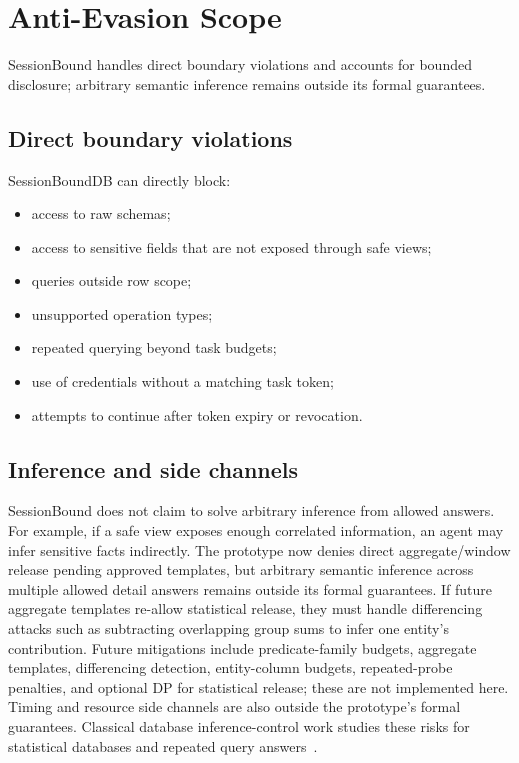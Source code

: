 \documentclass[journal]{IEEEtran}
\providecommand{\tightlist}{%
  \setlength{\itemsep}{0pt}\setlength{\parskip}{0pt}}
\begin{document}
\hypertarget{anti-evasion-scope}{%
\section{Anti-Evasion Scope}\label{anti-evasion-scope}}

SessionBound handles direct boundary violations and accounts for bounded
disclosure; arbitrary semantic inference remains outside its formal
guarantees.

\hypertarget{direct-boundary-violations}{%
\subsection{Direct boundary
violations}\label{direct-boundary-violations}}

SessionBoundDB can directly block:

\begin{itemize}
\tightlist
\item
  access to raw schemas;
\item
  access to sensitive fields that are not exposed through safe views;
\item
  queries outside row scope;
\item
  unsupported operation types;
\item
  repeated querying beyond task budgets;
\item
  use of credentials without a matching task token;
\item
  attempts to continue after token expiry or revocation.
\end{itemize}

\hypertarget{inference-and-side-channels}{%
\subsection{Inference and side
channels}\label{inference-and-side-channels}}

SessionBound does not claim to solve arbitrary inference from allowed
answers. For example, if a safe view exposes enough correlated
information, an agent may infer sensitive facts indirectly. The
prototype now denies direct aggregate/window release pending approved
templates, but arbitrary semantic inference across multiple allowed
detail answers remains outside its formal guarantees. If future
aggregate templates re-allow statistical release, they must handle
differencing attacks such as subtracting overlapping group sums to infer
one entity's contribution. Future mitigations include predicate-family
budgets, aggregate templates, differencing detection, entity-column
budgets, repeated-probe penalties, and optional DP for statistical
release; these are not implemented here.
Timing and resource side channels are also outside the prototype's
formal guarantees.
Classical database inference-control work studies these risks for
statistical databases and repeated query answers~\cite{adam1989securitycontrol}.
\end{document}
